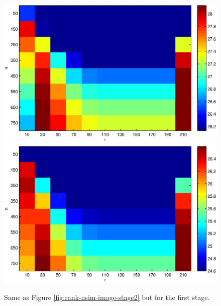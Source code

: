 \documentclass[10pt, journal, twocolumn, final, a4paper]{IEEEtran}
\begin{document}
\begin{figure}[htpb!]
\begin{center}
		\includegraphics[width=.25\textwidth]{figs/params_tables/bpsnr_r1-np1-image_s30_average_mono.eps}%
		\includegraphics[width=.25\textwidth]{figs/params_tables/bpsnr_r1-np1-image_s40_average_mono.eps}\\
	\end{center}
	\caption{Same as Figure \ref{fig:rank-nsim-image-stage2} but for the first stage.}
	\label{fig:rank-nsim-image-stage1}
\end{figure}

%
%
\end{document}

